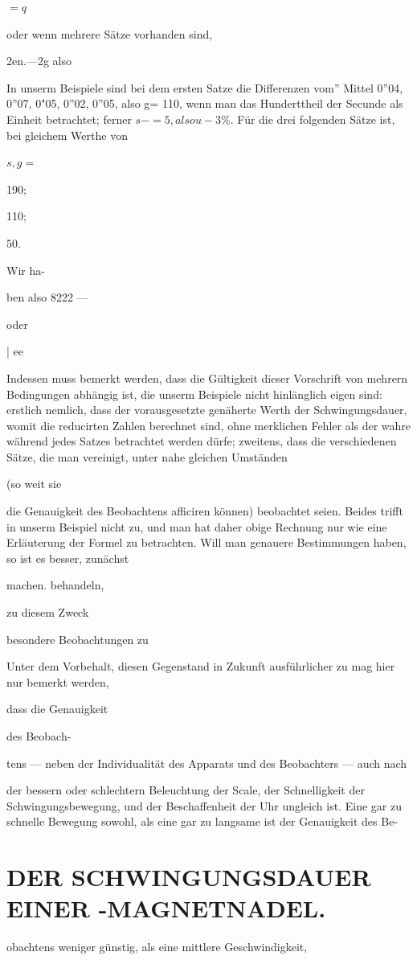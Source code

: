 \documentclass[12pt,a4paper]{article}
\begin{document}
$=q$

oder wenn mehrere Sätze vorhanden sind,

2en.—2g also

In unserm Beispiele sind bei dem ersten Satze die Differenzen vom” Mittel 0”04, 0”07, 0"05, 0”02, 0”05, also g= 110, wenn man das Hunderttheil der Secunde als Einheit betrachtet; ferner $s-=5, also u -3\%.$ Für die drei folgenden Sätze ist, bei gleichem Werthe von

$s, g =$

190;

110;

50.

Wir ha-

ben also 8222 —

oder

| ee

Indessen muss bemerkt werden, dass die Gültigkeit dieser Vorschrift von mehrern Bedingungen abhängig ist, die unserm Beispiele nicht hinlänglich eigen sind: erstlich nemlich, dass der vorausgesetzte genäherte Werth der Schwingungsdauer, womit die reducirten Zahlen berechnet sind, ohne merklichen Fehler als der wahre während jedes Satzes betrachtet werden dürfe; zweitens, dass die verschiedenen Sätze, die man vereinigt, unter nahe gleichen Umständen

(so weit sie

die Genauigkeit des Beobachtens afficiren können) beobachtet seien. Beides trifft in unserm Beispiel nicht zu, und man hat daher obige Rechnung nur wie eine Erläuterung der Formel zu betrachten. Will man genauere Bestimmungen haben, so ist es besser, zunächst

machen. behandeln,

zu diesem Zweck

besondere Beobachtungen zu

Unter dem Vorbehalt, diesen Gegenstand in Zukunft ausführlicher zu mag hier nur bemerkt werden,

dass die Genauigkeit

des Beobach-

tens — neben der Individualität des Apparats und des Beobachters — auch nach

der bessern oder schlechtern Beleuchtung der Scale, der Schnelligkeit der Schwingungsbewegung, und der Beschaffenheit der Uhr ungleich ist. Eine gar zu schnelle Bewegung sowohl, als eine gar zu langsame ist der Genauigkeit des Be-

\section*{DER SCHWINGUNGSDAUER EINER -MAGNETNADEL.}
obachtens weniger günstig, als eine mittlere Geschwindigkeit,
\end{document}
